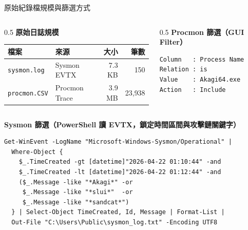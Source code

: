 \documentclass[12pt,aspectratio=169]{beamer}
\begin{document}
\begin{frame}[fragile]{原始紀錄檔規模與篩選方式}
\begin{columns}[T]
\begin{column}{0.5\textwidth}
\textbf{\small 原始日誌規模}
\begin{table}
\centering
\footnotesize
\setlength{\tabcolsep}{4pt}
\begin{tabular}{@{}llrr@{}}
\toprule
檔案 & 來源 & 大小 & 筆數 \\
\midrule
\texttt{sysmon.log}  & Sysmon EVTX   & 7.3 KB & 150 \\
\texttt{procmon.CSV} & Procmon Trace & 3.9 MB & 23{,}938 \\
\bottomrule
\end{tabular}
\end{table}
\end{column}
\begin{column}{0.5\textwidth}
\textbf{\small Procmon 篩選（GUI Filter）}
\begin{lstlisting}[style=dark,basicstyle=\scriptsize\ttfamily\color{codefg}]
Column   : Process Name
Relation : is
Value    : Akagi64.exe
Action   : Include
\end{lstlisting}
\end{column}
\end{columns}

\vspace{-0.5em}
\textbf{\small Sysmon 篩選（PowerShell 讀 EVTX，鎖定時間區間與攻擊鏈關鍵字）}
\begin{lstlisting}[style=dark,basicstyle=\scriptsize\ttfamily\color{codefg}]
Get-WinEvent -LogName "Microsoft-Windows-Sysmon/Operational" |
  Where-Object {
    $_.TimeCreated -gt [datetime]"2026-04-22 01:10:44" -and
    $_.TimeCreated -lt [datetime]"2026-04-22 01:12:44" -and
    ($_.Message -like "*Akagi*" -or
     $_.Message -like "*slui*"  -or
     $_.Message -like "*sandcat*")
  } | Select-Object TimeCreated, Id, Message | Format-List |
  Out-File "C:\Users\Public\sysmon_log.txt" -Encoding UTF8
\end{lstlisting}
\end{frame}
\end{document}
